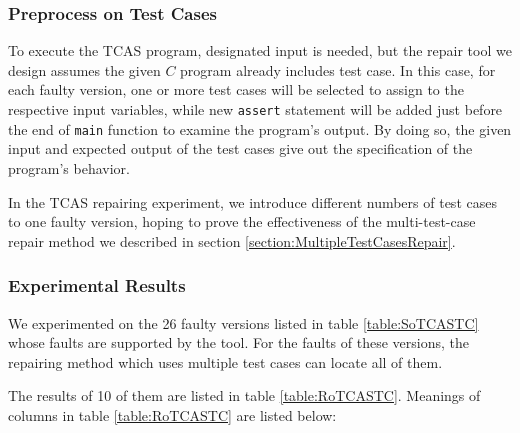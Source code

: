 \documentclass[10pt,journal,final,]{article}
\theoremstyle{definition}
\begin{document}
\subsubsection{Preprocess on Test Cases}
To execute the TCAS program, designated input is needed, but the repair tool we design assumes the given $C$ program already includes test case.
In this case, for each faulty version, one or more test cases will be selected to assign to the respective input variables, while new \lstinline|assert| statement will be added just before the end of \lstinline|main| function
to examine the program's output.
By doing so, the given input and expected output of the test cases give out the specification of the program's behavior.

In the TCAS repairing experiment, we introduce different numbers of test cases to one faulty version, hoping to prove the effectiveness of the multi-test-case repair method we described in section \ref{section:MultipleTestCasesRepair}.

\subsubsection{Experimental Results}
We experimented on the 26 faulty versions listed in table \ref{table:SoTCASTC} whose faults are supported by the tool.
For the faults of these versions, the repairing method which uses multiple test cases can locate all of them.

The results of 10 of them are listed in table \ref{table:RoTCASTC}. Meanings of columns in table \ref{table:RoTCASTC} are listed below:
\end{document}

